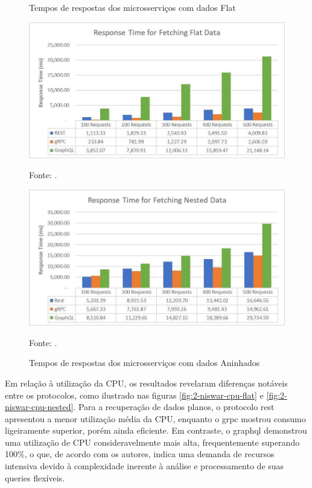 \begin{figure}[htb]
  \centering
  \begin{minipage}[t]{0.48\linewidth}
    \caption{Tempos de respostas dos microsserviços com dados Flat}
    \label{fig:2-niswar-time-flat}
    \centering
    \includegraphics[width=\linewidth]{imagens/niswar_time_flat.jpg}    
    {\par \raggedright \footnotesize Fonte: \textcite{niswar_performance_2024}.\par}
  \end{minipage}%
  \hfill
  \begin{minipage}[t]{0.48\linewidth}
    \caption{Tempos de respostas dos microsserviços com dados Aninhados}
    \label{fig:2-niswar-time-nested}
    \centering
    \includegraphics[width=\linewidth]{imagens/niswar_time_nested.jpg}    
    {\par \raggedright \footnotesize Fonte: \textcite{niswar_performance_2024}.\par}
  \end{minipage}
\end{figure}

Em relação à utilização da CPU, os resultados revelaram diferenças notáveis entre os protocolos, como ilustrado nas figuras \ref{fig:2-niswar-cpu-flat} e \ref{fig:2-niswar-cpu-nested}. Para a recuperação de dados planos, o protocolo \gls{rest} apresentou a menor utilização média da CPU, enquanto o \gls{grpc} mostrou consumo ligeiramente superior, porém ainda eficiente. Em contraste, o \acrshort{graphql} demonstrou uma utilização de CPU consideravelmente mais alta, frequentemente superando 100\%, o que, de acordo com os autores, indica uma demanda de recursos intensiva devido à complexidade inerente à análise e processamento de suas queries flexíveis.

